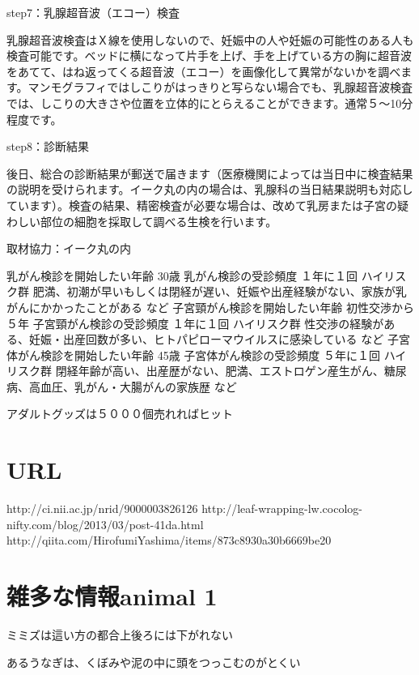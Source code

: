 step7：乳腺超音波（エコー）検査

乳腺超音波検査はＸ線を使用しないので、妊娠中の人や妊娠の可能性のある人も検査可能です。ベッドに横になって片手を上げ、手を上げている方の胸に超音波をあてて、はね返ってくる超音波（エコー）を画像化して異常がないかを調べます。マンモグラフィではしこりがはっきりと写らない場合でも、乳腺超音波検査では、しこりの大きさや位置を立体的にとらえることができます。通常５～10分程度です。

step8：診断結果

後日、総合の診断結果が郵送で届きます（医療機関によっては当日中に検査結果の説明を受けられます。イーク丸の内の場合は、乳腺科の当日結果説明も対応しています）。検査の結果、精密検査が必要な場合は、改めて乳房または子宮の疑わしい部位の細胞を採取して調べる生検を行います。

取材協力：イーク丸の内


乳がん検診を開始したい年齢        	30歳
乳がん検診の受診頻度 	１年に１回
ハイリスク群 	肥満、初潮が早いもしくは閉経が遅い、妊娠や出産経験がない、家族が乳がんにかかったことがある など
子宮頸がん検診を開始したい年齢 	初性交渉から５年
子宮頸がん検診の受診頻度 	１年に１回
ハイリスク群 	性交渉の経験がある、妊娠・出産回数が多い、ヒトパピローマウイルスに感染している など
子宮体がん検診を開始したい年齢 	45歳
子宮体がん検診の受診頻度 	５年に１回
ハイリスク群 	閉経年齢が高い、出産歴がない、肥満、エストロゲン産生がん、糖尿病、高血圧、乳がん・大腸がんの家族歴 など




アダルトグッズは５０００個売れればヒット

\section{URL}
http://ci.nii.ac.jp/nrid/9000003826126
http://leaf-wrapping-lw.cocolog-nifty.com/blog/2013/03/post-41da.html
http://qiita.com/HirofumiYashima/items/873c8930a30b6669be20

\section{雑多な情報animal 1}

ミミズは這い方の都合上後ろには下がれない

あるうなぎは、くぼみや泥の中に頭をつっこむのがとくい



